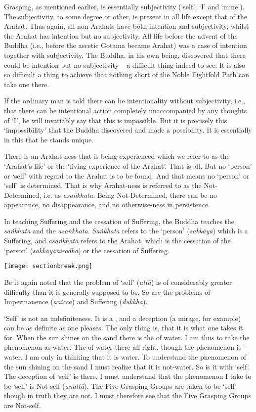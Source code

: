 Grasping, as mentioned earlier, is essentially subjectivity (`self', `I' and `mine'). The subjectivity, to some degree or other, is present in all life except that of the Arahat. Thus again, all non-Arahats have both intention and subjectivity, whilst the Arahat has intention but no subjectivity. All life before the advent of the Buddha (i.e., before the ascetic Gotama became Arahat) was a case of intention together with subjectivity. The Buddha, in his own being, discovered that there could be intention but no subjectivity -- a difficult thing indeed to see. It is also so difficult a thing to achieve that nothing short of the Noble Eightfold Path can take one there.

If the ordinary man is told there can be intentionality without subjectivity, i.e., that there can be intentional action completely unaccompanied by any thoughts of `I', he will invariably say that this is impossible. But it is precisely this `impossibility' that the Buddha discovered and made a possibility. It is essentially in this that he stands unique.

There is an Arahat-ness that is being experienced which we refer to as the `Arahat's life' or the `living experience of the Arahat'. That is all. But no `person' or `self' with regard to the Arahat is to be found. And that means no `person' or `self' is determined. That is why Arahat-ness is referred to as the Not-Determined, i.e. as \emph{asaṅkhata}. Being Not-Determined, there can be no appearance, no disappearance, and no otherwise-ness in persistence.

In teaching Suffering and the cessation of Suffering, the Buddha teaches the \emph{saṅkhata} and the \emph{asaṅkhata}. \emph{Saṅkhata} refers to the `person' (\emph{sakkāya}) which is a Suffering, and \emph{asaṅkhata} refers to the Arahat, which is the cessation of the `person' (\emph{sakkāyanirodha}) or the cessation of Suffering.

\texttt{[image: sectionbreak.png]}

Be it again noted that the problem of `self' (\emph{attā}) is of considerably greater difficulty than it is generally supposed to be. So are the problems of Impermanence (\emph{anicca}) and Suffering (\emph{dukkha}).

`Self' is not an indefiniteness. It is a , and a deception (a mirage, for example) can be as definite as one pleases. The only thing is, that it is  what one takes it for. When the sun shines on the sand there is the  of water. I am thus  to take the phenomenon as water. The  of water  there all right, though the phenomenon is -water. I am only  in thinking that it is water. To understand the phenomenon of the sun shining on the sand I must realize that it is not-water. So is it with `self'. The deception of `self' is there. I must understand that the phenomenon I take to be `self' is Not-self (\emph{anattā}). The Five Grasping Groups are taken to be `self' though in truth they are not. I must therefore see that the Five Grasping Groups are Not-self.


